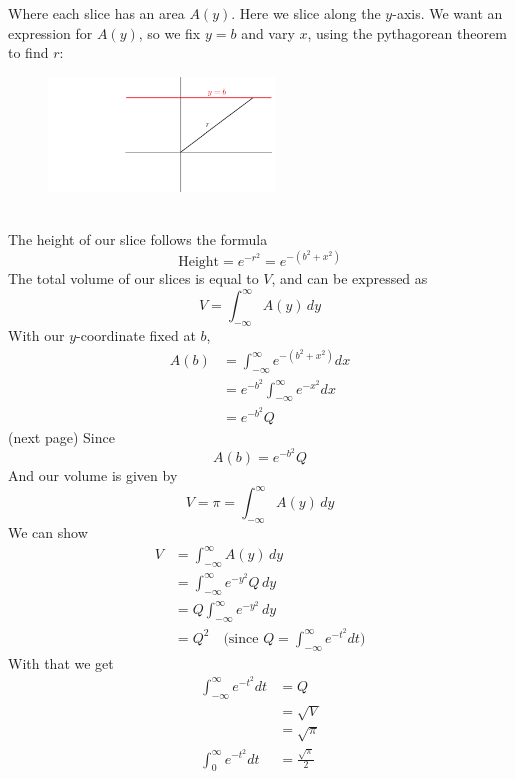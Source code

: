 \documentclass{report}
\begin{document}
Where each slice has an area $A(y)$.
Here we slice along the $y$-axis. We want an expression for $A(y)$, so we fix $y=b$ 
and vary $x$, using the pythagorean theorem to find $r$:
\begin{figure}[h]
\includegraphics[width=6cm]{Capture41}\\
\centering
{}
\end{figure}\\
The height of our slice follows the formula
\begin{equation*}
\text{Height}=e^{-r^2}=e^{-(b^2+x^2)}
\end{equation*}
The total volume of our slices is equal to $V$, and can be expressed as 
\begin{equation*}
V=\int_{-\infty}^{\infty}A(y)\,dy
\end{equation*}
With our $y$-coordinate fixed at $b$,
\begin{align*}
A(b)&=\int_{-\infty}^{\infty}e^{-(b^2+x^2)}dx\\
&=e^{-b^2}\int_{-\infty}^{\infty}e^{-x^2}dx\\
&=e^{-b^2}Q
\end{align*}
(next page)
\newpage
\noindent Since
\begin{equation*}
A(b)=e^{-b^2}Q
\end{equation*}
And our volume is given by
\begin{equation*}
V=\pi=\int_{-\infty}^{\infty}A(y)\,dy
\end{equation*}
We can show
\begin{align*}
V&=\int_{-\infty}^{\infty}A(y)\,dy\\
&=\int_{-\infty}^{\infty}e^{-y^2}Q\,dy\\
&=Q\int_{-\infty}^{\infty}e^{-y^2}\,dy\\
&=Q^2\quad\text{(since $Q=\int^{\infty}_{-\infty}e^{-t^2}dt$)}
\end{align*}
With that we get 
\begin{align*}
\int^{\infty}_{-\infty}e^{-t^2}dt&=Q\\
&=\sqrt{V}\\
&=\sqrt{\pi}\\
\int^{\infty}_{0}e^{-t^2}dt&=\frac{\sqrt{\pi}}{2}
\end{align*}
\newpage
\end{document}
